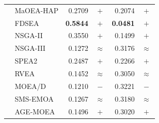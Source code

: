 \begin{table}[!htbp]
\begin{tabular}{|l|l|r|c|r|c|}
 & MaOEA-HAP & 0.2709 & $+$ & 0.2074 & $+$ \\
 & FDSEA & \textbf{0.5844} & $+$ & \textbf{0.0481} & $+$ \\
 & NSGA-II & 0.3550 & $+$ & 0.1499 & $+$ \\
 & NSGA-III & 0.1272 & $\approx$ & 0.3176 & $\approx$ \\
 & SPEA2 & 0.2487 & $+$ & 0.2266 & $+$ \\
 & RVEA & 0.1452 & $\approx$ & 0.3050 & $\approx$ \\
 & MOEA/D & 0.1210 & $-$ & 0.3221 & $-$ \\
 & SMS-EMOA & 0.1267 & $\approx$ & 0.3180 & $\approx$ \\
 & AGE-MOEA & 0.1496 & $+$ & 0.3020 & $+$ \\
\hline
\end{tabular}
\end{table}
